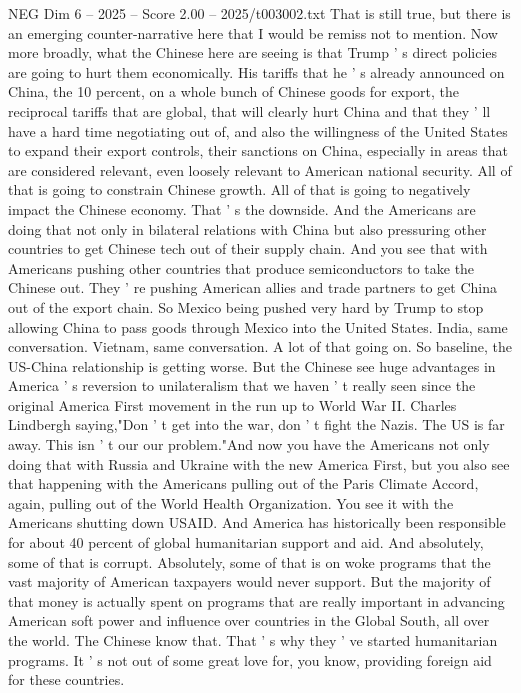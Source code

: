 \begin{textsample}{NEG Dim 6 – 2025 – Score 2.00 – 2025/t003002.txt}
That is still true, but there is an emerging counter-narrative here that I would be remiss not to mention.
Now more broadly, what the Chinese here are seeing is that Trump ' s direct policies are going to hurt them economically.
His tariffs that he ' s already announced on China, the 10 percent, on a whole bunch of Chinese goods for export, the reciprocal tariffs that are global, that will clearly hurt China and that they ' ll have a hard time negotiating out of, and also the willingness of the United States to expand their export controls, their sanctions on China, especially in areas that are considered relevant, even loosely relevant to American national security.
All of that is going to constrain Chinese growth.
All of that is going to negatively impact the Chinese economy.
That ' s the downside.
And the Americans are doing that not only in bilateral relations with China but also pressuring other countries to get Chinese tech out of their supply chain.
And you see that with Americans pushing other countries that produce semiconductors to take the Chinese out.
They ' re pushing American allies and trade partners to get China out of the export chain.
So Mexico being pushed very hard by Trump to stop allowing China to pass goods through Mexico into the United States.
India, same conversation.
Vietnam, same conversation.
A lot of that going on.
So baseline, the US-China relationship is getting worse.
But the Chinese see huge advantages in America ' s reversion to unilateralism that we haven ' t really seen since the original America First movement in the run up to World War II.
Charles Lindbergh saying,"Don ' t get into the war, don ' t fight the Nazis.
The US is far away.
This isn ' t our our problem."And now you have the Americans not only doing that with Russia and Ukraine with the new America First, but you also see that happening with the Americans pulling out of the Paris Climate Accord, again, pulling out of the World Health Organization.
You see it with the Americans shutting down USAID.
And America has historically been responsible for about 40 percent of global humanitarian support and aid.
And absolutely, some of that is corrupt.
Absolutely, some of that is on woke programs that the vast majority of American taxpayers would never support.
But the majority of that money is actually spent on programs that are really important in advancing American soft power and influence over countries in the Global South, all over the world.
The Chinese know that.
That ' s why they ' ve started humanitarian programs.
It ' s not out of some great love for, you know, providing foreign aid for these countries.

\end{textsample}
